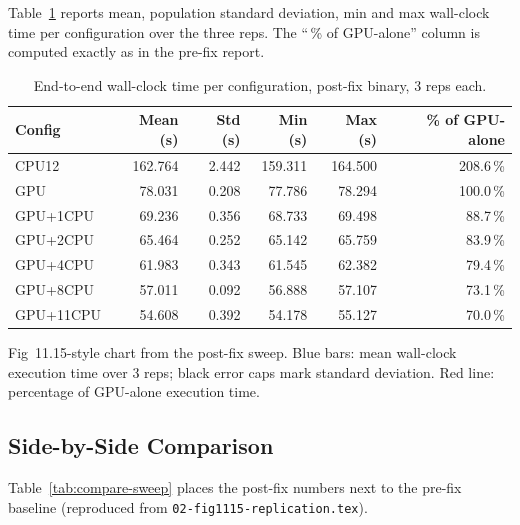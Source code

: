 \documentclass[
	english,
	letterpaper, oneside
]{article}
\begin{document}
Table~\ref{tab:results-post} reports mean, population standard deviation,
min and max wall-clock time per configuration over the three reps. The
``\,\% of GPU-alone'' column is computed exactly as in the pre-fix
report.

\begin{table}[H]
    \centering
    \caption{End-to-end wall-clock time per configuration, post-fix
             binary, 3 reps each.}
    \label{tab:results-post}
    \begin{tabular}{lrrrrr}
        \hline
        Config & Mean (s) & Std (s) & Min (s) & Max (s) & \% of GPU-alone \\
        \hline
        CPU12      & 162.764 & 2.442 & 159.311 & 164.500 & 208.6\,\% \\
        GPU        &  78.031 & 0.208 &  77.786 &  78.294 & 100.0\,\% \\
        GPU+1CPU   &  69.236 & 0.356 &  68.733 &  69.498 &  88.7\,\% \\
        GPU+2CPU   &  65.464 & 0.252 &  65.142 &  65.759 &  83.9\,\% \\
        GPU+4CPU   &  61.983 & 0.343 &  61.545 &  62.382 &  79.4\,\% \\
        GPU+8CPU   &  57.011 & 0.092 &  56.888 &  57.107 &  73.1\,\% \\
        GPU+11CPU  &  54.608 & 0.392 &  54.178 &  55.127 &  70.0\,\% \\
        \hline
    \end{tabular}
\end{table}

            {Fig~11.15-style chart from the post-fix sweep. Blue bars:
             mean wall-clock execution time over 3 reps; black error
             caps mark standard deviation. Red line: percentage of
             GPU-alone execution time. \label{fig:postfix}}

\subsection{Side-by-Side Comparison}

Table~\ref{tab:compare-sweep} places the post-fix numbers next to the
pre-fix baseline (reproduced from
\texttt{02-fig1115-replication.tex}).
\end{document}
